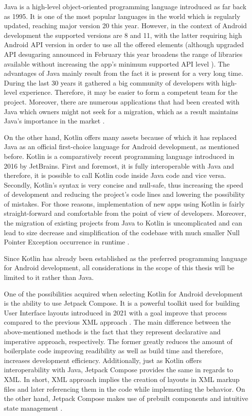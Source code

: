 Java is a high-level object-oriented programming language introduced as far back as 1995. It is one of the most popular languages in the world which is regularly updated, reaching major version 20 this year. However, in the context of Android development the supported versions are 8 and 11, with the latter requiring high Android API version in order to use all the offered elements (although upgraded API desugaring announced in February this year broadens the range of libraries available without increasing the app's minimum supported API level \cite{android_api_desugaring}). The advantages of Java mainly result from the fact it is present for a very long time. During the last 30 years it gathered a big community of developers with high-level experience. Therefore, it may be easier to form a competent team for the project. Moreover, there are numerous applications that had been created with Java which owners might not seek for a migration, which as a result maintains Java's importance in the market \cite{kc_kotlin_vs_java}.

On the other hand, Kotlin offers many assets because of which it has replaced Java as an official first-choice language for Android development, as mentioned before. Kotlin is a comparatively recent programming language introduced in 2016 by JetBrains. First and foremost, it is fully interoperable with Java and therefore, it is possible to call Kotlin code inside Java code and vice versa. Secondly, Kotlin's syntax is very concise and null-safe, thus increasing the speed of development and reducing the project's code lines and lowering the possibility of mistakes. For those reasons, implementation of new apps using Kotlin is fairly straight-forward and comfortable from the point of view of developers. Moreover, the migration of existing projects from Java to Kotlin is uncomplicated and can lead to size decrease and simplification of the codebase with much smaller Null Pointer Exception occurrence in runtime \cite{android_kotlin_first}.

Since Kotlin has already been established as the preferred programming language for Android development, all considerations in the scope of this thesis will be limited to it rather than Java.

One of the possibilities acquired when selecting Kotlin for Android development is the ability to use Jetpack Compose. It is a powerful toolkit used for building User Interface layouts introduced in 2021 with a goal improve that process compared to the previous XML approach \cite{android_jetpack_compose}. 
The main difference between the above-mentioned methods is the fact that they represent declarative and imperative approach, respectively. The former greatly reduces the amount of boilerplate code improving readibility as well as build time and therefore, increases development efficiency. Additionally, just as Kotlin offers interoperability with Java, Jetpack Compose provides the same in regards to XML. In short, XML approach implies the creation of layouts in XML markup files and later referencing them in the code while implementing the behavior. On the other hand, Jetpack Compose makes use of prebuilt components and intuitive state management \cite{jetpack_compose_vs_xml}. 

